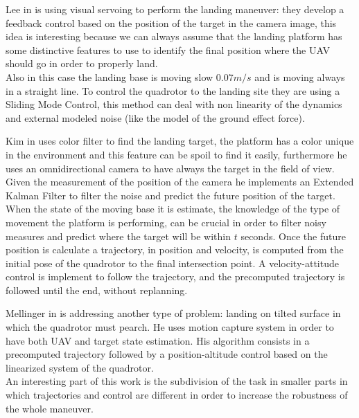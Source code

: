 Lee in \cite{lee2012autonomous} is using visual servoing to perform the landing maneuver: they develop a feedback control based on the position of the target in the camera image, this idea is interesting because we can always assume that the landing platform has some distinctive features to use to identify the final position where the UAV should go in order to properly land.\\
Also in this case the landing base is moving slow $0.07m/s$ and is moving always in a straight line. To control the quadrotor to the landing site they are using a Sliding Mode Control, this method can deal with non linearity of the dynamics and external modeled noise (like the model of the ground effect force). 

Kim in \cite{Kim2016} uses color filter to find the landing target, the platform has a color unique in the environment and this feature can be spoil to find it easily, furthermore he uses an omnidirectional camera to have always the target in the field of view. Given the measurement of the position of the camera he implements an Extended Kalman Filter to filter the noise and predict the future position of the target. When the state of the moving base it is estimate, the knowledge of the type of movement the platform is performing, can be crucial in order to filter noisy measures and predict where the target will be within $t$ seconds. Once the future position is calculate a trajectory, in position and velocity, is computed from the initial pose of the quadrotor to the final intersection point. A velocity-attitude control is implement to follow the trajectory, and the precomputed trajectory is followed until the end, without replanning.

Mellinger in \cite{mellinger2010control} is addressing another type of problem: landing on tilted surface in which the quadrotor must pearch. He uses  motion capture system in order to have both UAV and target state estimation. His algorithm consists 
in a precomputed trajectory followed by a position-altitude control based on the linearized system of the quadrotor.\\
An interesting part of this work is the subdivision of the task in smaller parts in which trajectories and control are different in order to increase the robustness of the whole maneuver.

